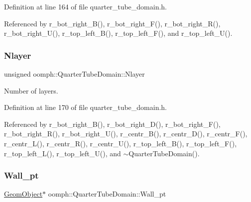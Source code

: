 Definition at line 164 of file quarter\+\_\+tube\+\_\+domain.\+h.



Referenced by r\+\_\+bot\+\_\+right\+\_\+\+B(), r\+\_\+bot\+\_\+right\+\_\+\+F(), r\+\_\+bot\+\_\+right\+\_\+\+R(), r\+\_\+bot\+\_\+right\+\_\+\+U(), r\+\_\+top\+\_\+left\+\_\+\+B(), r\+\_\+top\+\_\+left\+\_\+\+F(), and r\+\_\+top\+\_\+left\+\_\+\+U().

\mbox{\label{classoomph_1_1QuarterTubeDomain_a64d806aba766a439eb6ea49798c50b13}} 
\subsubsection{\texorpdfstring{Nlayer}{Nlayer}}
{\footnotesize\ttfamily unsigned oomph\+::\+Quarter\+Tube\+Domain\+::\+Nlayer\hspace{0.3cm}{\ttfamily [private]}}



Number of layers. 



Definition at line 170 of file quarter\+\_\+tube\+\_\+domain.\+h.



Referenced by r\+\_\+bot\+\_\+right\+\_\+\+B(), r\+\_\+bot\+\_\+right\+\_\+\+D(), r\+\_\+bot\+\_\+right\+\_\+\+F(), r\+\_\+bot\+\_\+right\+\_\+\+R(), r\+\_\+bot\+\_\+right\+\_\+\+U(), r\+\_\+centr\+\_\+\+B(), r\+\_\+centr\+\_\+\+D(), r\+\_\+centr\+\_\+\+F(), r\+\_\+centr\+\_\+\+L(), r\+\_\+centr\+\_\+\+R(), r\+\_\+centr\+\_\+\+U(), r\+\_\+top\+\_\+left\+\_\+\+B(), r\+\_\+top\+\_\+left\+\_\+\+F(), r\+\_\+top\+\_\+left\+\_\+\+L(), r\+\_\+top\+\_\+left\+\_\+\+U(), and $\sim$\+Quarter\+Tube\+Domain().

\mbox{\label{classoomph_1_1QuarterTubeDomain_af394493bc3c3b0f06d9f591e1d02c0f9}} 
\subsubsection{\texorpdfstring{Wall\+\_\+pt}{Wall\_pt}}
{\footnotesize\ttfamily \hyperlink{classoomph_1_1GeomObject}{Geom\+Object}$\ast$ oomph\+::\+Quarter\+Tube\+Domain\+::\+Wall\+\_\+pt\hspace{0.3cm}{\ttfamily [private]}}



